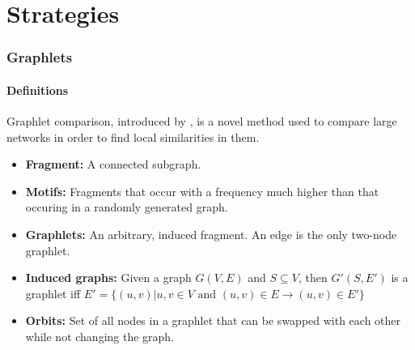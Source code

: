 \documentclass{beamer}
\begin{document}
\section{Strategies}
\begin{frame}
    \frametitle{Graphlets}
    \framesubtitle{Definitions}
    Graphlet comparison, introduced by ,
    is a novel method used to compare large networks in order to
    find local similarities in them.
    \begin{itemize}
        \item \textbf{Fragment:} A connected subgraph.
        \item \textbf{Motifs:} Fragments that occur with a frequency much higher than
            that occuring in a randomly generated graph.
        \item \textbf{Graphlets:} An arbitrary, induced fragment.
        An edge is the only two-node graphlet.
        \item \textbf{Induced graphs:} Given a graph $G(V, E)$ and $S \subseteq V$,
            then $G'(S, E')$
            is a graphlet iff $E' = \{(u, v) | u, v \in V \text{ and } 
            (u, v) \in E \rightarrow (u, v) \in E'\}$
        \item \textbf{Orbits:} Set of all nodes in a graphlet that can be
            swapped with each other while not changing the graph.
    \end{itemize}
\end{frame}
\end{document}
